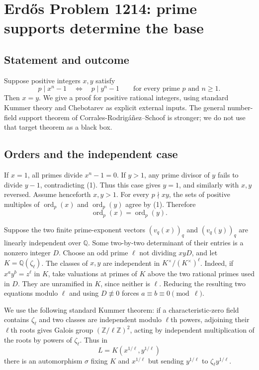 \section*{Erd\H{o}s Problem 1214: prime supports determine the base}
\subsection*{Statement and outcome}
Suppose positive integers $x,y$ satisfy
\[
 p\mid x^n-1\quad\Longleftrightarrow\quad p\mid y^n-1
 \qquad\text{for every prime }p\text{ and }n\ge1.
 \tag{1}
\]
Then $x=y$. We give a proof for positive rational integers, using standard Kummer theory and Chebotarev as explicit external inputs. The general number-field support theorem of Corrales-Rodrig\'a\~nez--Schoof is stronger; we do not use that target theorem as a black box.

\subsection*{Orders and the independent case}
If $x=1$, all primes divide $x^n-1=0$. If $y>1$, any prime divisor of $y$ fails to divide $y-1$, contradicting (1). Thus this case gives $y=1$, and similarly with $x,y$ reversed. Assume henceforth $x,y>1$.
For every $p\nmid xy$, the sets of positive multiples of $\operatorname{ord}_p(x)$ and $\operatorname{ord}_p(y)$ agree by (1). Therefore
\[
 \operatorname{ord}_p(x)=\operatorname{ord}_p(y).
 \tag{2}
\]

Suppose the two finite prime-exponent vectors $(v_q(x))_q$ and $(v_q(y))_q$ are linearly independent over $\mathbb Q$. Some two-by-two determinant of their entries is a nonzero integer $D$. Choose an odd prime $\ell$ not dividing $xyD$, and let $K=\mathbb Q(\zeta_\ell)$.
The classes of $x,y$ are independent in $K^\times/(K^\times)^\ell$.
Indeed, if $x^ay^b=z^\ell$ in $K$, take valuations at primes of $K$ above the two rational primes used in $D$. They are unramified in $K$, since neither is $\ell$. Reducing the resulting two equations modulo $\ell$ and using $D\not\equiv0$ forces $a\equiv b\equiv0\pmod\ell$.

We use the following standard Kummer theorem: if a characteristic-zero field contains $\zeta_\ell$ and two classes are independent modulo $\ell$th powers, adjoining their $\ell$th roots gives Galois group $(\mathbb Z/\ell\mathbb Z)^2$, acting by independent multiplication of the roots by powers of $\zeta_\ell$.
Thus in
\[
 L=K(x^{1/\ell},y^{1/\ell})
\]
there is an automorphism $\sigma$ fixing $K$ and $x^{1/\ell}$ but sending $y^{1/\ell}$ to $\zeta_\ell y^{1/\ell}$.

